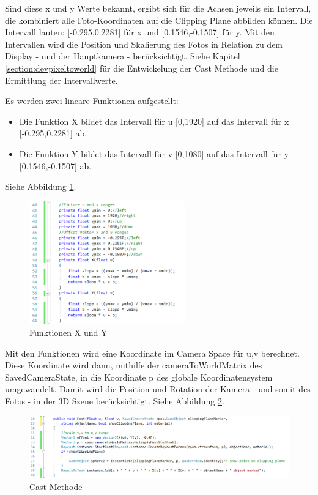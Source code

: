 Sind diese x und y Werte bekannt, ergibt sich für die Achsen jeweils ein Intervall, die kombiniert alle Foto-Koordinaten auf die Clipping Plane abbilden können. Die Intervall lauten: [-0.295,0.2281] für x und [0.1546,-0.1507] für y. Mit den Intervallen wird die Position und Skalierung des Fotos in Relation zu dem Display - und der Hauptkamera - berücksichtigt. Siehe Kapitel \ref{section:devpixeltoworld} für die Entwickelung der Cast Methode und die Ermittlung der Intervallwerte.

Es werden zwei lineare Funktionen aufgestellt:
\begin{itemize}
	\item Die Funktion X bildet das Intervall für u [0,1920] auf das Intervall für x [-0.295,0.2281] ab.
	\item Die Funktion Y bildet das Intervall für v [0,1080] auf das Intervall für y [0.1546,-0.1507] ab.
\end{itemize}
Siehe Abbildung \ref{code:uvtoxy}.
\begin{figure}[H]
	\centering
	\includegraphics[width=0.6\textwidth]{images/code_uv_to_xy_scale.PNG}
	\caption[]{Funktionen X und Y}
	\label{code:uvtoxy}
\end{figure}

Mit den Funktionen wird eine Koordinate im Camera Space für u,v berechnet. Diese Koordinate wird dann, mithilfe der cameraToWorldMatrix des SavedCameraState, in die Koordinate p des globale Koordinatensystem umgewandelt. Damit wird die Position und Rotation der Kamera - und somit des Fotos - in der 3D Szene berücksichtigt. Siehe Abbildung \ref{code:castmethod}.

\begin{figure}[H]
	\centering
	\includegraphics[width=1.2\textwidth]{images/code_cast_method.PNG}
	\caption[]{Cast Methode}
	\label{code:castmethod}
\end{figure}

